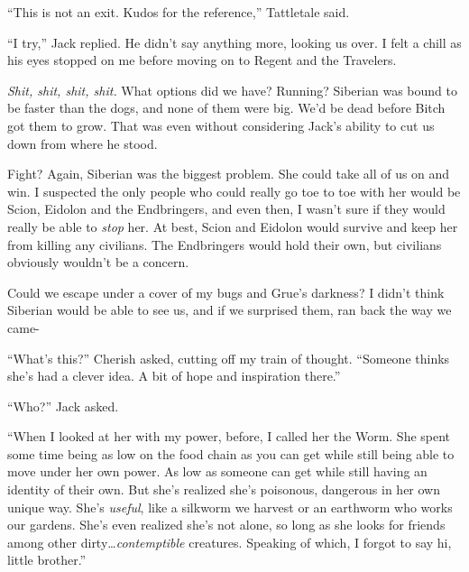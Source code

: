 





``This is not an exit.  Kudos for the reference,'' Tattletale said.



``I try,'' Jack replied.  He didn't say anything more, looking us over.  I felt a chill as his eyes stopped on me before moving on to Regent and the Travelers.



\emph{Shit, shit, shit, shit.}  What options did we have?  Running?  Siberian was bound to be faster than the dogs, and none of them were big.  We'd be dead before Bitch got them to grow.  That was even without considering Jack's ability to cut us down from where he stood.



Fight?  Again, Siberian was the biggest problem.  She could take all of us on and win.  I suspected the only people who could really go toe to toe with her would be Scion, Eidolon and the Endbringers, and even then, I wasn't sure if they would really be able to \emph{stop} her.  At best, Scion and Eidolon would survive and keep her from killing any civilians.  The Endbringers would hold their own, but civilians obviously wouldn't be a concern.



Could we escape under a cover of my bugs and Grue's darkness?  I didn't think Siberian would be able to see us, and if we surprised them, ran back the way we came-



``What's this?'' Cherish asked, cutting off my train of thought. ``Someone thinks she's had a clever idea.  A bit of hope and inspiration there.''



``Who?'' Jack asked.



``When I looked at her with my power, before, I called her the Worm.  She spent some time being as low on the food chain as you can get while still being able to move under her own power.  As low as someone can get while still having an identity of their own.  But she's realized she's poisonous, dangerous in her own unique way.  She's \emph{useful}, like a silkworm we harvest or an earthworm who works our gardens.  She's even realized she's not alone, so long as she looks for friends among other dirty\ldots \emph{contemptible} creatures.  Speaking of which, I forgot to say hi, little brother.''



